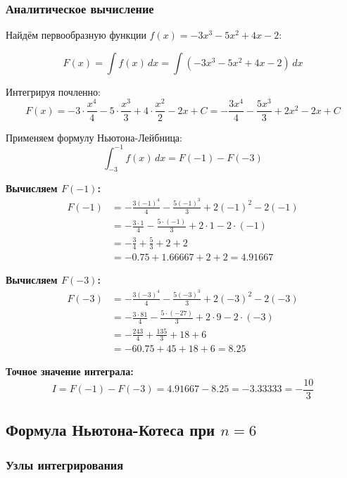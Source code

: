 \documentclass[a4paper,12pt]{article}
\begin{document}
\subsubsection*{Аналитическое вычисление}

Найдём первообразную функции $f(x) = -3x^3 - 5x^2 + 4x - 2$:

\[
F(x) = \int f(x)\,dx = \int (-3x^3 - 5x^2 + 4x - 2)\,dx
\]

Интегрируя почленно:
\[
F(x) = -3 \cdot \frac{x^4}{4} - 5 \cdot \frac{x^3}{3} + 4 \cdot \frac{x^2}{2} - 2x + C = -\frac{3x^4}{4} - \frac{5x^3}{3} + 2x^2 - 2x + C
\]

Применяем формулу Ньютона-Лейбница:
\[
\int_{-3}^{-1} f(x)\,dx = F(-1) - F(-3)
\]

\textbf{Вычисляем $F(-1)$:}
\begin{align*}
F(-1) &= -\frac{3(-1)^4}{4} - \frac{5(-1)^3}{3} + 2(-1)^2 - 2(-1) \\
&= -\frac{3 \cdot 1}{4} - \frac{5 \cdot (-1)}{3} + 2 \cdot 1 - 2 \cdot (-1) \\
&= -\frac{3}{4} + \frac{5}{3} + 2 + 2 \\
&= -0.75 + 1.66667 + 2 + 2 = 4.91667
\end{align*}

\textbf{Вычисляем $F(-3)$:}
\begin{align*}
F(-3) &= -\frac{3(-3)^4}{4} - \frac{5(-3)^3}{3} + 2(-3)^2 - 2(-3) \\
&= -\frac{3 \cdot 81}{4} - \frac{5 \cdot (-27)}{3} + 2 \cdot 9 - 2 \cdot (-3) \\
&= -\frac{243}{4} + \frac{135}{3} + 18 + 6 \\
&= -60.75 + 45 + 18 + 6 = 8.25
\end{align*}

\textbf{Точное значение интеграла:}
\[
I = F(-1) - F(-3) = 4.91667 - 8.25 = -3.33333 = -\frac{10}{3}
\]


\newpage

\subsection{Формула Ньютона-Котеса при $n = 6$}

\subsubsection*{Узлы интегрирования}
\end{document}

